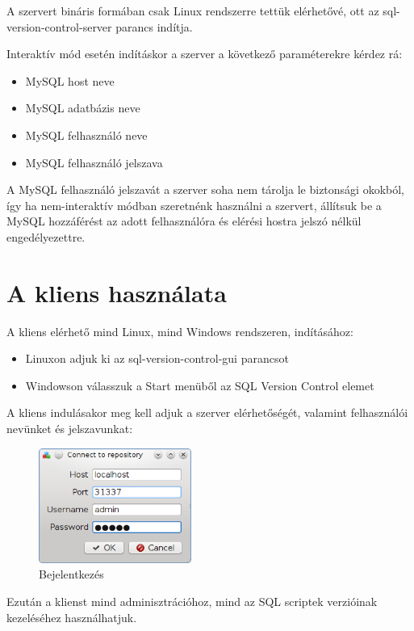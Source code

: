 \documentclass[a4paper,12pt]{article}
\begin{document}
A szervert bináris formában csak Linux rendszerre tettük elérhetővé, ott az
sql-version-control-server parancs indítja.

Interaktív mód esetén indításkor a szerver a következő paraméterekre kérdez rá:

\begin{itemize}
\item MySQL host neve
\item MySQL adatbázis neve
\item MySQL felhasználó neve
\item MySQL felhasználó jelszava
\end{itemize}

A MySQL felhasználó jelszavát a szerver soha nem tárolja le biztonsági okokból,
így ha nem-interaktív módban szeretnénk használni a szervert, állítsuk be a
MySQL hozzáférést az adott felhasználóra és elérési hostra jelszó nélkül
engedélyezettre.

\section{A kliens használata}

A kliens elérhető mind Linux, mind Windows rendszeren, indításához:

\begin{itemize}
\item Linuxon adjuk ki az sql-version-control-gui parancsot
\item Windowson válasszuk a Start menüből az SQL Version Control elemet
\end{itemize}

A kliens indulásakor meg kell adjuk a szerver elérhetőségét, valamint
felhasználói nevünket és jelszavunkat:

\begin{figure}[H]
\centering
\includegraphics[width=50mm,keepaspectratio]{user-login.png}
\caption{Bejelentkezés}
\end{figure}

Ezután a klienst mind adminisztrációhoz, mind az SQL scriptek verzióinak
kezeléséhez használhatjuk.
\end{document}
